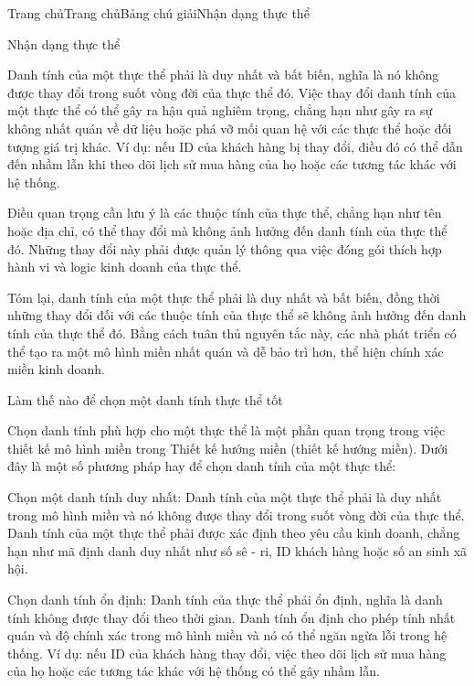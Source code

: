 


Trang chủTrang chủBảng chú giảiNhận dạng thực thể

Nhận dạng thực thể

Danh tính của một thực thể phải là duy nhất và bất biến, nghĩa là nó không được thay đổi trong suốt vòng đời của thực thể đó. Việc thay đổi danh tính của một thực thể có thể gây ra hậu quả nghiêm trọng, chẳng hạn như gây ra sự không nhất quán về dữ liệu hoặc phá vỡ mối quan hệ với các thực thể hoặc đối tượng giá trị khác. Ví dụ: nếu ID của khách hàng bị thay đổi, điều đó có thể dẫn đến nhầm lẫn khi theo dõi lịch sử mua hàng của họ hoặc các tương tác khác với hệ thống.

Điều quan trọng cần lưu ý là các thuộc tính của thực thể, chẳng hạn như tên hoặc địa chỉ, có thể thay đổi mà không ảnh hưởng đến danh tính của thực thể đó. Những thay đổi này phải được quản lý thông qua việc đóng gói thích hợp hành vi và logic kinh doanh của thực thể.

Tóm lại, danh tính của một thực thể phải là duy nhất và bất biến, đồng thời những thay đổi đối với các thuộc tính của thực thể sẽ không ảnh hưởng đến danh tính của thực thể đó. Bằng cách tuân thủ nguyên tắc này, các nhà phát triển có thể tạo ra một mô hình miền nhất quán và dễ bảo trì hơn, thể hiện chính xác miền kinh doanh.

Làm thế nào để chọn một danh tính thực thể tốt

Chọn danh tính phù hợp cho một thực thể là một phần quan trọng trong việc thiết kế mô hình miền trong Thiết kế hướng miền (thiết kế hướng miền). Dưới đây là một số phương pháp hay để chọn danh tính của một thực thể:

Chọn một danh tính duy nhất: Danh tính của một thực thể phải là duy nhất trong mô hình miền và nó không được thay đổi trong suốt vòng đời của thực thể. Danh tính của một thực thể phải được xác định theo yêu cầu kinh doanh, chẳng hạn như mã định danh duy nhất như số sê - ri, ID khách hàng hoặc số an sinh xã hội.

Chọn danh tính ổn định: Danh tính của thực thể phải ổn định, nghĩa là danh tính không được thay đổi theo thời gian. Danh tính ổn định cho phép tính nhất quán và độ chính xác trong mô hình miền và nó có thể ngăn ngừa lỗi trong hệ thống. Ví dụ: nếu ID của khách hàng thay đổi, việc theo dõi lịch sử mua hàng của họ hoặc các tương tác khác với hệ thống có thể gây nhầm lẫn.


